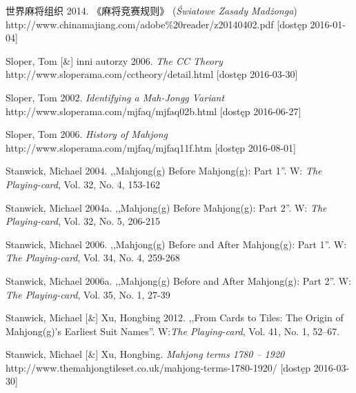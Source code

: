  世界麻将组织 2014. 《麻将竞赛规则》 (\textit{Światowe Zasady Madżonga})
\\http://www.chinamajiang.com/adobe\%20reader/z20140402.pdf [dostęp 2016-01-04]

Sloper, Tom [\&] inni autorzy 2006. \textit{The CC Theory}
\\http://www.sloperama.com/cctheory/detail.html [dostęp
2016-03-30]

Sloper, Tom 2002. \textit{Identifying a Mah-Jongg Variant}
\\http://www.sloperama.com/mjfaq/mjfaq02b.html [dostęp
2016-06-27]

Sloper, Tom 2006. \textit{History of Mahjong}
\\http://www.sloperama.com/mjfaq/mjfaq11f.htm [dostęp 2016-08-01]

Stanwick, Michael 2004. ,,Mahjong(g) Before Mahjong(g): Part 1''. W:
\textit{The Playing-card}, Vol. 32, No. 4, 153-162

Stanwick, Michael 2004a. ,,Mahjong(g) Before Mahjong(g): Part 2''. W:
\textit{The Playing-card}, Vol. 32, No. 5, 206-215

Stanwick, Michael 2006. ,,Mahjong(g) Before and After Mahjong(g): Part 1''. W:
\textit{The Playing-card}, Vol. 34, No. 4, 259-268

Stanwick, Michael 2006a. ,,Mahjong(g) Before and After Mahjong(g): Part 2''. W:
\textit{The Playing-card}, Vol. 35, No. 1, 27-39


Stanwick, Michael [\&] Xu, Hongbing 2012. ,,From Cards to Tiles: The Origin of
Mahjong(g)’s Earliest Suit Names''. W:\textit{The Playing-card}, Vol. 41, No. 1,
52–67.

Stanwick, Michael [\&] Xu, Hongbing. \textit{Mahjong terms 1780 – 1920}
\\http://www.themahjongtileset.co.uk/mahjong-terms-1780-1920/ [dostęp
2016-03-30]

